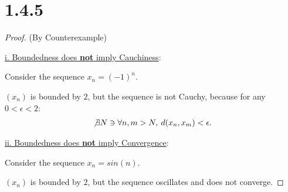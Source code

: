 \documentclass{article}
\begin{document}
\section*{1.4.5}
\begin{proof}(By Counterexample)
  $ $

  \underline{i. Boundedness does \textbf{not} imply Cauchiness}:

  Consider the sequence $x_n = (-1)^n$.

  $(x_n)$ is bounded by $2$, but the sequence is not Cauchy, because for any $0 < \epsilon < 2$: 
  \begin{align*}
    \not \exists N \ni \forall n,m > N, \: d(x_n, x_m) < \epsilon.
  \end{align*}

  \underline{ii. Boundedness does \textbf{not} imply Convergence}:

  Consider the sequence $x_n = sin(n)$.

  $(x_n)$ is bounded by $2$, but the sequence oscillates and does not converge.

\end{proof}
\end{document}
